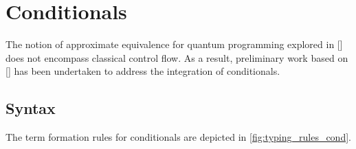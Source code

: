 \section{Conditionals}

The notion of approximate equivalence for quantum programming explored in [\cite{dahlqvist2022syntactic}] does not encompass classical control flow. As a result, preliminary work based on [\cite{crole1993categories,selinger2013lecture}]   has been undertaken to address the integration of conditionals. 

\subsection{Syntax}

The term formation rules for conditionals are depicted in
\autoref{fig:typing_rules_cond}. 

